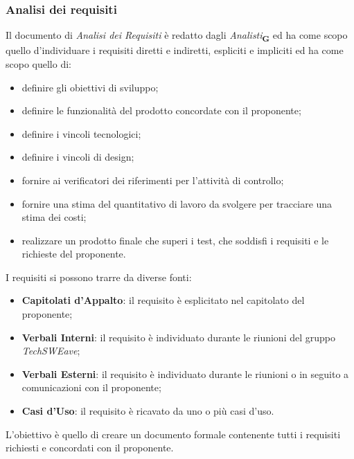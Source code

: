\subsubsection{Analisi dei requisiti}
Il documento di \textit{Analisi dei Requisiti} è redatto dagli \textit{Analisti}\textsubscript{\textbf{G}} ed ha come scopo quello d'individuare i requisiti diretti e indiretti, espliciti e impliciti ed ha come scopo quello di:
\begin{itemize}
    \item definire gli obiettivi di sviluppo;
    \item definire le funzionalità del prodotto concordate con il proponente;
    \item definire i vincoli tecnologici;
    \item definire i vincoli di design;
    \item fornire ai verificatori dei riferimenti per l'attività di controllo;
    \item fornire una stima del quantitativo di lavoro da svolgere per tracciare una stima dei costi;
    \item realizzare un prodotto finale che superi i test, che soddisfi i requisiti e le richieste del proponente.
\end{itemize}
I requisiti si possono trarre da diverse fonti:
\begin{itemize}
    \item \textbf{Capitolati d'Appalto}: il requisito è esplicitato nel capitolato del proponente;
    \item \textbf{Verbali Interni}: il requisito è individuato durante le riunioni del gruppo \textit{TechSWEave};
    \item \textbf{Verbali Esterni}: il requisito è individuato durante le riunioni o in seguito a comunicazioni con il proponente;
    \item \textbf{Casi d'Uso}: il requisito è ricavato da uno o più casi d'uso.
\end{itemize}
L'obiettivo è quello di creare un documento formale contenente tutti i requisiti richiesti e concordati con il proponente.

